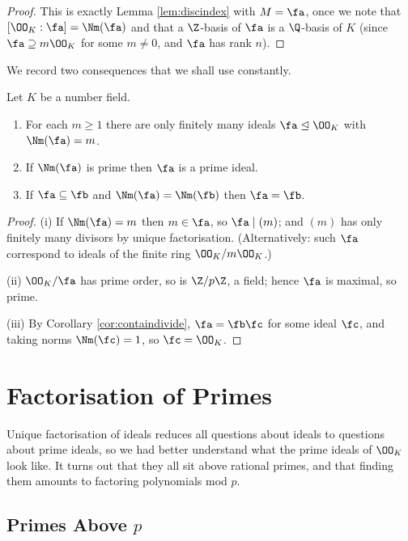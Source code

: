 \begin{proof}
	This is exactly Lemma \ref{lem:discindex} with $M = \fa$, once we note that $[\OO_K:\fa] = \Nm(\fa)$ and that a $\Z$-basis of $\fa$ is a $\Q$-basis of $K$ (since $\fa \supseteq m\OO_K$ for some $m \neq 0$, and $\fa$ has rank $n$).
\end{proof}

We record two consequences that we shall use constantly.

\begin{corollary}\label{cor:normbounds}
	Let $K$ be a number field.
	\begin{enumerate}[label=(\roman*)]
		\item For each $m \geq 1$ there are only finitely many ideals $\fa \trianglelefteq \OO_K$ with $\Nm(\fa) = m$.
		\item If $\Nm(\fa)$ is prime then $\fa$ is a prime ideal.
		\item If $\fa \subseteq \fb$ and $\Nm(\fa) = \Nm(\fb)$ then $\fa = \fb$.
	\end{enumerate}
\end{corollary}

\begin{proof}
	(i) If $\Nm(\fa) = m$ then $m \in \fa$, so $\fa \mid (m)$; and $(m)$ has only finitely many divisors by unique factorisation. (Alternatively: such $\fa$ correspond to ideals of the finite ring $\OO_K/m\OO_K$.)

	(ii) $\OO_K/\fa$ has prime order, so is $\Z/p\Z$, a field; hence $\fa$ is maximal, so prime.

	(iii) By Corollary \ref{cor:containdivide}, $\fa = \fb\fc$ for some ideal $\fc$, and taking norms $\Nm(\fc) = 1$, so $\fc = \OO_K$.
\end{proof}

\section{Factorisation of Primes}\label{sec:ram}

Unique factorisation of ideals reduces all questions about ideals to questions about prime ideals, so we had better understand what the prime ideals of $\OO_K$ look like. It turns out that they all sit above rational primes, and that finding them amounts to factoring polynomials mod $p$.

\subsection{Primes Above $p$}

